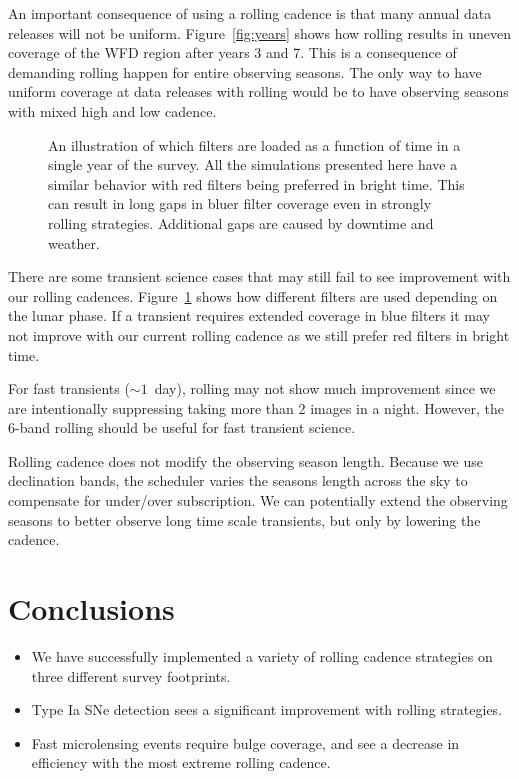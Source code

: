\documentclass[modern]{aastex62}
\begin{document}
An important consequence of using a rolling cadence is that many annual data releases will not be uniform. Figure~\ref{fig:years} shows how rolling results in uneven coverage of the WFD region after years 3 and 7. This is a consequence of demanding rolling happen for entire observing seasons. The only way to have uniform coverage at data releases with rolling would be to have observing seasons with mixed high and low cadence.



\begin{figure}
\caption{An illustration of which filters are loaded as a function of time in a single year of the survey. All the simulations presented here have a similar behavior with red filters being preferred in bright time. This can result in long gaps in bluer filter coverage even in strongly rolling strategies. Additional gaps are caused by downtime and weather. \label{fig:hour}}
\end{figure}

There are some transient science cases that may still fail to see improvement with our rolling cadences. Figure~\ref{fig:hour} shows how different filters are used depending on the lunar phase. If a transient requires extended coverage in blue filters it may not improve with our current rolling cadence as we still prefer red filters in bright time.

For fast transients ($\sim 1$\ day), rolling may not show much improvement since we are intentionally suppressing taking more than 2 images in a night. However, the 6-band rolling should be useful for fast transient science.

Rolling cadence does not modify the observing season length. Because we use declination bands, the scheduler varies the seasons length across the sky to compensate for under/over subscription. We can potentially extend the observing seasons to better observe long time scale transients, but only by lowering the cadence. 



\section{Conclusions}

\begin{itemize}
    \item{We have successfully implemented a variety of rolling cadence strategies on three different survey footprints.}
    \item{Type Ia SNe detection sees a significant improvement with rolling strategies.}
    \item{Fast microlensing events require bulge coverage, and see a decrease in efficiency with the most extreme rolling cadence.}
\end{itemize}
\end{document}
